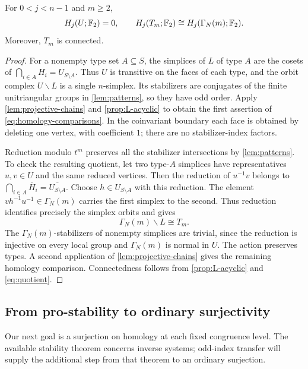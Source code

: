 \begin{proposition}\label{prop:homology-comparisons}
For $0<j<n-1$ and $m\ge2$,
\begin{equation}\label{eq:homology-comparisons}
 H_j(U;\mathbb F_2)=0,\qquad
 H_j(T_m;\mathbb F_2)\cong H_j(\Gamma_N(m);\mathbb F_2).
\end{equation}
Moreover, $T_m$ is connected.
\end{proposition}

\begin{proof}
For a nonempty type set $A\subseteq S$, the simplices of $L$ of type $A$
are the cosets of $\bigcap_{i\in A}H_i=U_{S\setminus A}$. Thus $U$ is
transitive on the faces of each type, and the orbit complex $U\backslash L$
is a single $n$-simplex. Its stabilizers are conjugates of the finite
unitriangular groups in \cref{lem:patterns}, so they have odd order.
Apply \cref{lem:projective-chains} and \cref{prop:L-acyclic} to obtain
the first assertion of \eqref{eq:homology-comparisons}. In the coinvariant
boundary each face is obtained by deleting one vertex, with coefficient
$1$; there are no stabilizer-index factors.

Reduction modulo $t^m$ preserves all the stabilizer intersections by
\cref{lem:patterns}. To check the resulting quotient, let two type-$A$
simplices have representatives $u,v\in U$ and the same reduced vertices.
Then the reduction of $u^{-1}v$ belongs to
$\bigcap_{i\in A}\overline H_i=\overline{U_{S\setminus A}}$.
Choose $h\in U_{S\setminus A}$ with this reduction. The element
$vh^{-1}u^{-1}\in\Gamma_N(m)$ carries the first simplex to the second.
Thus reduction identifies precisely the simplex orbits and gives
\begin{equation}\label{eq:quotient}
 \Gamma_N(m)\backslash L\cong T_m.
\end{equation}
The $\Gamma_N(m)$-stabilizers of nonempty simplices are trivial, since
the reduction is injective on every local group and $\Gamma_N(m)$ is
normal in $U$. The action preserves types. A second application of
\cref{lem:projective-chains} gives the remaining homology comparison.
Connectedness follows from \cref{prop:L-acyclic} and \eqref{eq:quotient}.
\end{proof}

\subsection{From pro-stability to ordinary surjectivity}
\label{subsec:pro-stability}

Our next goal is a surjection on homology at each fixed congruence level.
The available stability theorem concerns inverse systems; odd-index
transfer will supply the additional step from that theorem to an
ordinary surjection.

